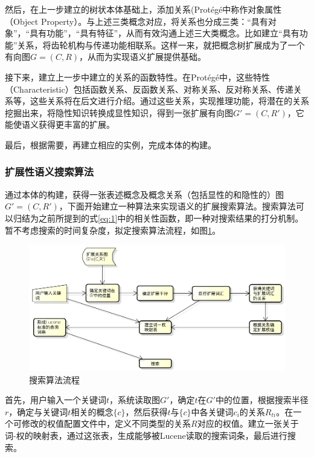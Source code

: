 \documentclass[12pt,a4paper]{article}
\newcommand{\wuhao}{\fontsize{10.5pt}{\baselineskip}\selectfont}
\begin{document}
	然后，在上一步建立的树状本体基础上，添加关系({\Times Prot{\'e}g{\'e}}中称作对象属性（{\Times Object Property}）。与上述三类概念对应，将关系也分成三类：“具有对象”，“具有功能”，“具有特征”，从而有效沟通上述三大类概念。比如建立“具有功能”关系，将齿轮机构与传递功能相联系。这样一来，就把概念树扩展成为了一个有向图$ G=(C, R) $，从而为实现语义扩展提供基础。
	
	接下来，建立上一步中建立的关系的函数特性。在{\Times Prot{\'e}g{\'e}}中，这些特性（{\Times Characteristic}）包括函数关系、反函数关系、对称关系、反对称关系、传递关系等，这些关系将在后文进行介绍。通过这些关系，实现推理功能，将潜在的关系挖掘出来，将隐性知识转换成显性知识，得到一张扩展有向图$ G'=(C, R')$，它能使语义获得更丰富的扩展。
	
	最后，根据需要，再建立相应的实例，完成本体的构建。
	
		\subsubsection{扩展性语义搜索算法}
	通过本体的构建，获得一张表述概念及概念关系（包括显性的和隐性的）图$ G'=(C, R') $，下面开始建立一种算法来实现语义的扩展搜索算法。搜索算法可以归结为之前所提到的式\ref{eq:1}中的相关性函数，即一种对搜索结果的打分机制。暂不考虑搜索的时间复杂度，拟定搜索算法流程，如图\ref{fig:搜索算法流程}。
	
	\begin{figure}[htbp] 
	\centering\includegraphics[width=5in]{fig/searchFlow.png} 
	\caption{\wuhao 搜索算法流程}\label{fig:搜索算法流程} 
	\end{figure} 
	
	首先，用户输入一个关键词$t$，系统读取图$G'$，确定$t$在$G'$中的位置，根据搜索半径$r$，确定与关键词$t$相关的概念$\{c\}$，然后获得$t$与$\{c\}$中各关键词$c_{i}$的关系$R_{ti}$。在一个可修改的权值配置文件中，定义不同类型的关系$R$对应的权值。建立一张关于词-权的映射表，通过这张表，生成能够被{\Times Lucene}读取的搜索词条，最后进行搜索。
	
\end{document}

